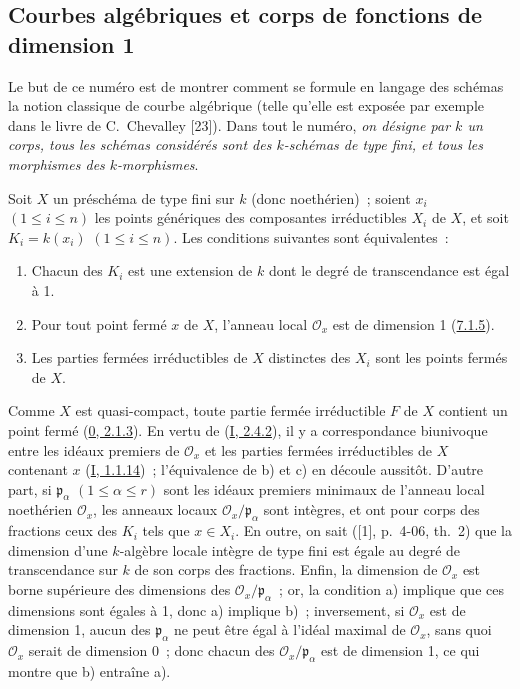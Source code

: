 \subsection{Courbes algébriques et corps de fonctions de dimension 1}
\label{subsection:II.7.4-fr}

Le but de ce numéro est de montrer comment se formule en langage des schémas
la notion classique de courbe algébrique (telle qu'elle est exposée par
exemple dans le livre de C.~Chevalley [23]). Dans tout le numéro, \emph{on
désigne par $k$ un corps, tous les schémas considérés sont des $k$-schémas de
type fini, et tous les morphismes des $k$-morphismes}.

\begin{proposition}[7.4.1]
\label{II.7.4.1-fr}
Soit $X$ un préschéma de type fini sur $k$ (donc noethérien)~; soient $x_i$
$(1\leq i\leq n)$ les points génériques des composantes irréductibles $X_i$ de
$X$, et soit $K_i=k(x_i)$ $(1\leq i\leq n)$. Les conditions suivantes sont
équivalentes~:
\begin{enumerate}
\item[\rm a)] Chacun des $K_i$ est une extension de $k$ dont le degré de
transcendance est égal à 1.
\item[\rm b)] Pour tout point fermé $x$ de $X$, l'anneau local
$\mathcal{O}_x$ est de dimension 1 (\hyperref[II.7.1.5-fr]{7.1.5}).
\item[\rm c)] Les parties fermées irréductibles de $X$ distinctes des $X_i$
sont les points fermés de $X$.
\end{enumerate}
\end{proposition}

Comme $X$ est quasi-compact, toute partie fermée irréductible $F$ de $X$
contient un point fermé (\hyperref[0.2.1.3-fr]{0, 2.1.3}). En vertu de
(\hyperref[I.2.4.2-fr]{I, 2.4.2}), il y a correspondance biunivoque entre les
idéaux premiers de $\mathcal{O}_x$ et les parties fermées irréductibles de $X$
contenant $x$ (\hyperref[I.1.1.14-fr]{I, 1.1.14})~; l'équivalence de b) et c)
en découle aussitôt. D'autre part, si $\mathfrak{p}_\alpha$
$(1\leq\alpha\leq r)$ sont les idéaux premiers minimaux de l'anneau local
noethérien $\mathcal{O}_x$, les anneaux locaux
$\mathcal{O}_x/\mathfrak{p}_\alpha$ sont intègres, et ont pour corps des
fractions ceux des $K_i$ tels que $x\in X_i$. En outre, on sait ([1],
p.~4-06, th.~2) que la dimension d'une $k$-algèbre locale intègre de type fini
est égale au degré de transcendance sur $k$ de son corps des fractions. Enfin,
la dimension de $\mathcal{O}_x$ est borne supérieure des dimensions des
$\mathcal{O}_x/\mathfrak{p}_\alpha$~; or, la condition a) implique que ces
dimensions sont égales à 1, donc a) implique b)~; inversement, si
$\mathcal{O}_x$ est de dimension 1, aucun des $\mathfrak{p}_\alpha$ ne peut
être égal à l'idéal maximal de $\mathcal{O}_x$, sans quoi $\mathcal{O}_x$
serait de dimension 0~; donc chacun des
$\mathcal{O}_x/\mathfrak{p}_\alpha$ est de dimension 1, ce qui montre que b)
entraîne a).

